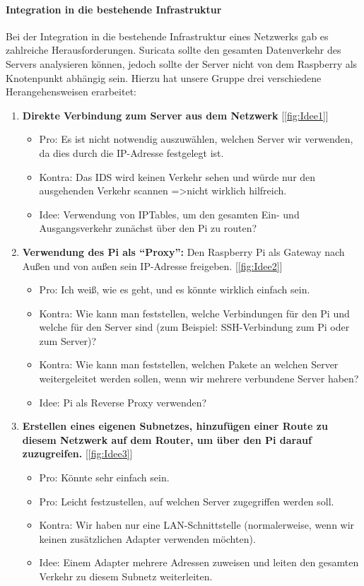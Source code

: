 \documentclass{article}
\begin{document}
\vfil \break

\paragraph{Integration in die bestehende Infrastruktur}
Bei der Integration in die bestehende Infrastruktur eines Netzwerks gab es zahlreiche Herausforderungen. Suricata sollte den gesamten Datenverkehr des Servers analysieren können, jedoch sollte der Server nicht von dem Raspberry als Knotenpunkt abhängig sein. Hierzu hat unsere Gruppe drei verschiedene Herangehensweisen erarbeitet:

\begin{enumerate}
    \item \textbf{Direkte Verbindung zum Server aus dem Netzwerk} [\ref{fig:Idee1}]
    \begin{itemize}
        \item Pro: Es ist nicht notwendig auszuwählen, welchen Server wir verwenden, da dies durch die IP-Adresse festgelegt ist.
        \item Kontra: Das IDS wird keinen Verkehr sehen und würde nur den ausgehenden Verkehr scannen =\textgreater  nicht wirklich hilfreich.
        \item Idee: Verwendung von IPTables, um den gesamten Ein- und Ausgangsverkehr zunächst über den Pi zu routen?
    \end{itemize}
    \item \textbf{Verwendung des Pi als ``Proxy'':} Den Raspberry Pi als Gateway nach Außen und von außen sein IP-Adresse freigeben. [\ref{fig:Idee2}]
    \begin{itemize}
        \item Pro: Ich weiß, wie es geht, und es könnte wirklich einfach sein.
        \item Kontra: Wie kann man feststellen, welche Verbindungen für den Pi und welche für den Server sind (zum Beispiel: SSH-Verbindung zum Pi oder zum Server)?
        \item Kontra: Wie kann man feststellen, welchen Pakete an welchen Server weitergeleitet werden sollen, wenn wir mehrere verbundene Server haben?
        \item Idee: Pi als Reverse Proxy verwenden?
    \end{itemize}
    
    \item \textbf{Erstellen eines eigenen Subnetzes, hinzufügen einer Route zu diesem Netzwerk auf dem Router, um über den Pi darauf zuzugreifen.} [\ref{fig:Idee3}]
    \begin{itemize}
        \item Pro: Könnte sehr einfach sein.
        \item Pro: Leicht festzustellen, auf welchen Server zugegriffen werden soll.
        \item Kontra: Wir haben nur eine LAN-Schnittstelle (normalerweise, wenn wir keinen zusätzlichen Adapter verwenden möchten).
        \item Idee: Einem Adapter mehrere Adressen zuweisen und leiten den gesamten Verkehr zu diesem Subnetz weiterleiten.
    \end{itemize}
\end{enumerate}
\vfil \break
\end{document}
